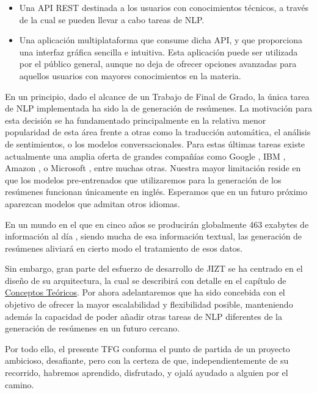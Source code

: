\vspace*{-0.3cm}

\begin{itemize}
	\item[\textbullet] Una API REST destinada a los usuarios con conocimientos técnicos, a través de la cual se pueden llevar a cabo tareas de NLP.
	\item[\textbullet] Una aplicación multiplataforma que consume dicha API, y que proporciona una interfaz gráfica sencilla e intuitiva. Esta aplicación puede ser utilizada por el público general, aunque no deja de ofrecer opciones avanzadas para aquellos usuarios con mayores conocimientos en la materia.
\end{itemize}

\vspace{-0.3cm}

En un principio, dado el alcance de un Trabajo de Final de Grado, la única tarea de NLP implementada ha sido la de generación de resúmenes. La motivación para esta decisión se ha fundamentado principalmente en la relativa menor popularidad de esta área frente a otras como la traducción automática, el análisis de sentimientos, o los modelos conversacionales. Para estas últimas tareas existe actualmente una amplia oferta de grandes compañías como Google \cite{cloudNL}, IBM \cite{watson}, Amazon \cite{comprehend}, o Microsoft \cite{textAnalytics}, entre muchas otras. Nuestra mayor limitación reside en que los modelos pre-entrenados que utilizaremos para la generación de los resúmenes funcionan únicamente en inglés. Esperamos que en un futuro próximo aparezcan modelos que admitan otros idiomas.

En un mundo en el que en cinco años se producirán globalmente 463 exabytes de información al día \cite{raconteur19}, siendo mucha de esa información textual, las generación de resúmenes aliviará en cierto modo el tratamiento de esos datos.

Sin embargo, gran parte del esfuerzo de desarrollo de JIZT se ha centrado en el diseño de su arquitectura, la cual se describirá con detalle en el capítulo de \hyperref[chapter:conceptos]{Conceptos Teóricos}. Por ahora adelantaremos que ha sido concebida con el objetivo de ofrecer la mayor escalabilidad y flexibilidad posible, manteniendo además la capacidad de poder añadir otras tareas de NLP diferentes de la generación de resúmenes en un futuro cercano.

Por todo ello, el presente TFG conforma el punto de partida de un proyecto ambicioso, desafiante, pero con la certeza de que, independientemente de su recorrido, habremos aprendido, disfrutado, y ojalá ayudado a alguien por el camino.